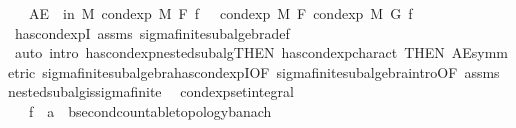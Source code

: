 \begin{isabellebody}
\ \ \ {\isachardoublequoteopen}AE\ {\isasymxi}\ in\ M{\isachardot}{\kern0pt}\ cond{\isacharunderscore}{\kern0pt}exp\ M\ F\ f\ {\isasymxi}\ {\isacharequal}{\kern0pt}\ cond{\isacharunderscore}{\kern0pt}exp\ M\ F\ {\isacharparenleft}{\kern0pt}cond{\isacharunderscore}{\kern0pt}exp\ M\ G\ f{\isacharparenright}{\kern0pt}\ {\isasymxi}{\isachardoublequoteclose}\isanewline
%
\isadelimproof
\ \ %
\endisadelimproof
%
\isatagproof
{}\isamarkupfalse%
\ has{\isacharunderscore}{\kern0pt}cond{\isacharunderscore}{\kern0pt}expI\ assms\ sigma{\isacharunderscore}{\kern0pt}finite{\isacharunderscore}{\kern0pt}subalgebra{\isacharunderscore}{\kern0pt}def\ \isamarkupfalse%
\ {\isacharparenleft}{\kern0pt}auto\ intro{\isacharbang}{\kern0pt}{\isacharcolon}{\kern0pt}\ has{\isacharunderscore}{\kern0pt}cond{\isacharunderscore}{\kern0pt}exp{\isacharunderscore}{\kern0pt}nested{\isacharunderscore}{\kern0pt}subalg{\isacharbrackleft}{\kern0pt}THEN\ has{\isacharunderscore}{\kern0pt}cond{\isacharunderscore}{\kern0pt}exp{\isacharunderscore}{\kern0pt}charact{\isacharparenleft}{\kern0pt}{}{\isacharparenright}{\kern0pt}{\isacharcomma}{\kern0pt}\ THEN\ AE{\isacharunderscore}{\kern0pt}symmetric{\isacharbrackright}{\kern0pt}\ sigma{\isacharunderscore}{\kern0pt}finite{\isacharunderscore}{\kern0pt}subalgebra{\isachardot}{\kern0pt}has{\isacharunderscore}{\kern0pt}cond{\isacharunderscore}{\kern0pt}expI{\isacharbrackleft}{\kern0pt}OF\ sigma{\isacharunderscore}{\kern0pt}finite{\isacharunderscore}{\kern0pt}subalgebra{\isachardot}{\kern0pt}intro{\isacharbrackleft}{\kern0pt}OF\ assms{\isacharparenleft}{\kern0pt}{}{\isacharparenright}{\kern0pt}{\isacharbrackright}{\kern0pt}{\isacharbrackright}{\kern0pt}\ nested{\isacharunderscore}{\kern0pt}subalg{\isacharunderscore}{\kern0pt}is{\isacharunderscore}{\kern0pt}sigma{\isacharunderscore}{\kern0pt}finite\ {\isacharparenright}{\kern0pt}%
\endisatagproof
{\isafoldproof}%
%
\isadelimproof
\isanewline
%
\endisadelimproof
\isanewline
{}\isamarkupfalse%
\ cond{\isacharunderscore}{\kern0pt}exp{\isacharunderscore}{\kern0pt}set{\isacharunderscore}{\kern0pt}integral{\isacharcolon}{\kern0pt}\isanewline
\ \ \ f\ {\isacharcolon}{\kern0pt}{\isacharcolon}{\kern0pt}\ {\isachardoublequoteopen}{\isacharprime}{\kern0pt}a\ {\isasymRightarrow}\ {\isacharprime}{\kern0pt}b{\isacharcolon}{\kern0pt}{\isacharcolon}{\kern0pt}{\isacharbraceleft}{\kern0pt}second{\isacharunderscore}{\kern0pt}countable{\isacharunderscore}{\kern0pt}topology{\isacharcomma}{\kern0pt}banach{\isacharbraceright}{\kern0pt}{\isachardoublequoteclose}\isanewline

\end{isabellebody}
